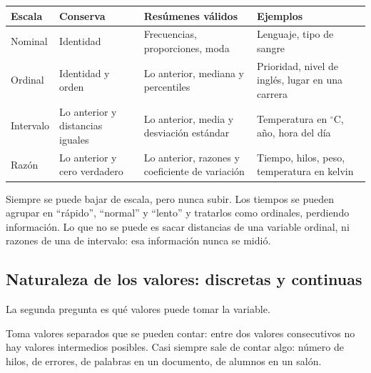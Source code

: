 \documentclass[11pt,letterpaper]{article}
\begin{document}
\begin{center}
\small
\begin{tabular}{l>{\raggedright\arraybackslash}p{2.4cm}%
                 >{\raggedright\arraybackslash}p{4.2cm}%
                 >{\raggedright\arraybackslash}p{4.2cm}}
    \toprule
    \textbf{Escala} & \textbf{Conserva} & \textbf{Resúmenes válidos}
    & \textbf{Ejemplos} \\
    \midrule
    Nominal & Identidad & Frecuencias, proporciones, moda
            & Lenguaje, tipo de sangre \\
    \addlinespace
    Ordinal & Identidad y orden & Lo anterior, mediana y percentiles
            & Prioridad, nivel de inglés, lugar en una carrera \\
    \addlinespace
    Intervalo & Lo anterior y distancias iguales
              & Lo anterior, media y desviación estándar
              & Temperatura en $^\circ$C, año, hora del día \\
    \addlinespace
    Razón & Lo anterior y cero verdadero
          & Lo anterior, razones y coeficiente de variación
          & Tiempo, hilos, peso, temperatura en kelvin \\
    \bottomrule
\end{tabular}
\end{center}

\begin{idea}
    Siempre se puede bajar de escala, pero nunca subir. Los tiempos se
    pueden agrupar en ``rápido'', ``normal'' y ``lento'' y tratarlos
    como ordinales, perdiendo información. Lo que no se puede es sacar
    distancias de una variable ordinal, ni razones de una de
    intervalo: esa información nunca se midió.
\end{idea}


\subsection*{Naturaleza de los valores: discretas y continuas}

La segunda pregunta es qué valores puede tomar la variable.

\begin{definicion}
    Toma valores separados que se pueden contar: entre dos valores
    consecutivos no hay valores intermedios posibles. Casi siempre
    sale de contar algo: número de hilos, de errores, de palabras en un
    documento, de alumnos en un salón.
\end{definicion}
\end{document}
